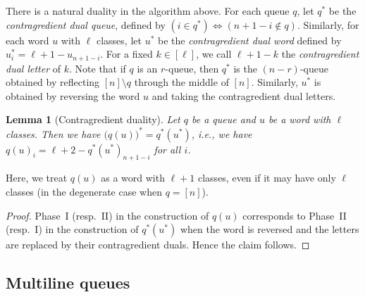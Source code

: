 \documentclass[reqno]{amsart}%
\newcommand{\0}{\phantom{c}}
\DeclareMathOperator{\inter}{int}
\newcommand{\defn}[1]{{\color{darkred}\emph{#1}}}
\theoremstyle{plain}
\newtheorem{lemma}[thm]{Lemma}
\theoremstyle{definition}
\newtheorem{remark}[thm]{Remark}
\numberwithin{equation}{section}
\begin{document}
There is a natural duality in the algorithm above. For each queue $q$, let
$q^{*}$ be the \defn{contragredient dual queue}, defined by $\left(  i \in
q^{*} \right)  \Longleftrightarrow\left(  n+1-i \notin q \right)  $.
Similarly, for each word $u$ with $\ell$ classes, let $u^{*}$ be the
\defn{contragredient dual word} defined by $u^{*}_{i} = \ell+ 1 - u_{n+1-i}$.
For a fixed $k \in\left[  \ell\right]  $, we call $\ell+ 1 - k$ the
\defn{contragredient dual letter} of $k$. Note that if $q$ is an $r$-queue,
then $q^{*}$ is the $(n-r)$-queue obtained by reflecting $[n] \setminus q$
through the middle of $[n]$. Similarly, $u^{*}$ is obtained by reversing the
word $u$ and taking the contragredient dual letters.

\begin{lemma}
[Contragredient duality]\label{le:dual} Let $q$ be a queue and $u$ be a word
with $\ell$ classes. Then we have $\bigl(q(u) \bigr)^{*} = q^{*}(u^{*})$,
\textit{i.e.}, we have $q(u)_{i} = \ell+ 2 - q^{*}(u^{*})_{n+1-i}$ for all $i$.
\end{lemma}

Here, we treat $q(u)$ as a word with $\ell+1$ classes, even if it may have
only $\ell$ classes (in the degenerate case when $q = \left[  n \right]  $).

\begin{proof}
Phase~I (resp.~II) in the construction of $q(u)$ corresponds to Phase~II
(resp.~I) in the construction of $q^{*}(u^{*})$ when the word is reversed and
the letters are replaced by their contragredient duals. Hence the claim follows.
\end{proof}





\subsection{Multiline queues}
\end{document}
